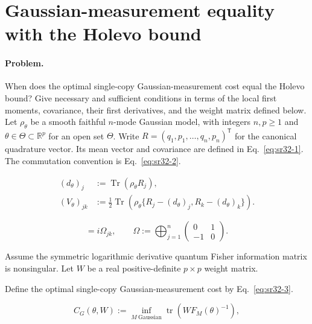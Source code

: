 \section{Gaussian-measurement equality with the Holevo bound}
\label{sec:op_8f1853475db7ea27}

\paragraph{Problem.}
When does the optimal single-copy Gaussian-measurement cost equal the Holevo bound?
Give necessary and sufficient conditions in terms of the local first moments, covariance, their first derivatives, and the weight matrix defined below.
Let $\rho_\theta$ be a smooth faithful $n$-mode Gaussian model, with integers $n,p\geq1$ and $\theta\in\Theta\subset\mathbb R^p$ for an open set $\Theta$. Write $R=(q_1,p_1,\ldots,q_n,p_n)^{\mathsf T}$ for the canonical quadrature vector. Its mean vector and covariance are defined in Eq.~\eqref{eq:sr32-1}. The commutation convention is Eq.~\eqref{eq:sr32-2}.

\begin{equation}
\begin{aligned}
 (d_\theta)_j&:=\operatorname{Tr}(\rho_\theta R_j),\\
 (V_\theta)_{jk}&:=\frac12\operatorname{Tr}(\rho_\theta\{R_j-(d_\theta)_j,R_k-(d_\theta)_k\}).
\end{aligned}
\label{eq:sr32-1}
\end{equation}

\begin{equation}
[R_j,R_k]=i\Omega_{jk},\qquad
\Omega:=\bigoplus_{j=1}^{n}\begin{pmatrix}0&1\\-1&0\end{pmatrix}.
\label{eq:sr32-2}
\end{equation}

Assume the symmetric logarithmic derivative quantum Fisher information matrix is nonsingular. Let $W$ be a real positive-definite $p\times p$ weight matrix.

Define the optimal single-copy Gaussian-measurement cost by Eq.~\eqref{eq:sr32-3}.

\begin{equation}
C_G(\theta,W):=\inf_{M\ \mathrm{Gaussian}}\operatorname{tr}(WF_M(\theta)^{-1}),
\label{eq:sr32-3}
\end{equation}

